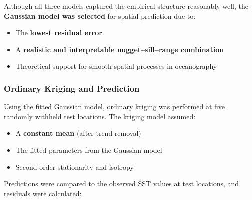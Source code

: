 \documentclass[
  11pt,
]{article}
\newenvironment{Shaded}{\begin{snugshade}}{\end{snugshade}}
\newcommand{\AttributeTok}[1]{\textcolor[rgb]{0.40,0.45,0.13}{#1}}
\newcommand{\CommentTok}[1]{\textcolor[rgb]{0.37,0.37,0.37}{#1}}
\newcommand{\FunctionTok}[1]{\textcolor[rgb]{0.28,0.35,0.67}{#1}}
\newcommand{\NormalTok}[1]{\textcolor[rgb]{0.00,0.23,0.31}{#1}}
\newcommand{\OtherTok}[1]{\textcolor[rgb]{0.00,0.23,0.31}{#1}}
\newcommand{\SpecialCharTok}[1]{\textcolor[rgb]{0.37,0.37,0.37}{#1}}
\newcommand{\StringTok}[1]{\textcolor[rgb]{0.13,0.47,0.30}{#1}}
\begin{document}
Although all three models captured the empirical structure reasonably
well, the \textbf{Gaussian model was selected} for spatial prediction
due to:

\begin{itemize}
\item
  The \textbf{lowest residual error}
\item
  A \textbf{realistic and interpretable nugget--sill--range combination}
\item
  Theoretical support for smooth spatial processes in oceanography
\end{itemize}

\subsubsection{\texorpdfstring{\textbf{Ordinary Kriging and
Prediction}}{Ordinary Kriging and Prediction}}\label{ordinary-kriging-and-prediction}

Using the fitted Gaussian model, ordinary kriging was performed at five
randomly withheld test locations. The kriging model assumed:

\begin{itemize}
\item
  A \textbf{constant mean} (after trend removal)
\item
  The fitted parameters from the Gaussian model
\item
  Second-order stationarity and isotropy
\end{itemize}

Predictions were compared to the observed SST values at test locations,
and residuals were calculated:

\begin{Shaded}
\end{Shaded}
\end{document}
